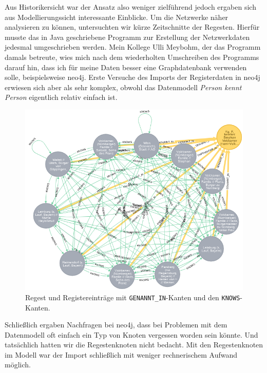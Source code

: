 \documentclass[ngerman,]{scrreprt}
\begin{document}
Aus Historikersicht war der Ansatz also weniger zielführend jedoch ergaben sich aus Modellierungssicht interessante Einblicke. Um die Netzwerke näher analysieren zu können, untersuchten wir kürze Zeitschnitte der Regesten. Hierfür musste das in Java geschriebene Programm zur Erstellung der Netzwerkdaten jedesmal umgeschrieben werden. Mein Kollege Ulli Meybohm, der das Programm damals betreute, wies mich nach dem wiederholten Umschreiben des Programms darauf hin, dass ich für meine Daten besser eine Graphdatenbank verwenden solle, beispielsweise neo4j. Erste Versuche des Imports der Registerdaten in neo4j erwiesen sich aber als sehr komplex, obwohl das Datenmodell \emph{Person kennt Person} eigentlich relativ einfach ist.

\begin{figure}
\centering
\includegraphics{Bilder/1zu1-Beziehungen-Register-Regest.png}
\caption{Regest und Registereinträge mit \texttt{GENANNT\_IN}-Kanten und den \texttt{KNOWS}-Kanten.}
\end{figure}

Schließlich ergaben Nachfragen bei neo4j, dass bei Problemen mit dem Datenmodell oft einfach ein Typ von Knoten vergessen worden sein könnte. Und tatsächlich hatten wir die Regestenknoten nicht bedacht. Mit den Regestenknoten im Modell war der Import schließlich mit weniger rechnerischem Aufwand möglich.
\end{document}
